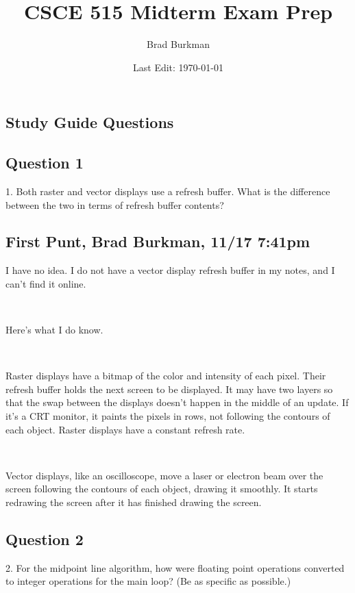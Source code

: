 \documentclass[11pt]{article}
\title{CSCE 515 Midterm Exam Prep}
\author{Brad Burkman}
\date{Last Edit: \today}
\begin{document}
\setlength{\parindent}{20pt}
\begin{spacing}{1.2}
\maketitle

\tableofcontents

\section{Study Guide Questions}

\subsection{Question 1}
1.  Both raster and vector displays use a refresh buffer.  What is the difference between the two in terms of refresh buffer contents?

\subsection{First Punt, Brad Burkman, 11/17 7:41pm}

I have no idea.  I do not have a vector display refresh buffer in my notes, and I can't find it online.  

\

Here's what I do know.  

\

Raster displays have a bitmap of the color and intensity of each pixel.  Their refresh buffer holds the next screen to be displayed.  It may have two layers so that the swap between the displays doesn't happen in the middle of an update.  If it's a CRT monitor, it paints the pixels in rows, not following the contours of each object.  Raster displays have a constant refresh rate.  

\

Vector displays, like an oscilloscope, move a laser or electron beam over the screen following the contours of each object, drawing it smoothly.  It starts redrawing the screen after it has finished drawing the screen.  



\subsection{Question 2}
2.  For the midpoint line algorithm, how were floating point operations converted to integer operations for the main loop?  (Be as specific as possible.)


\end{spacing}
\end{document}
